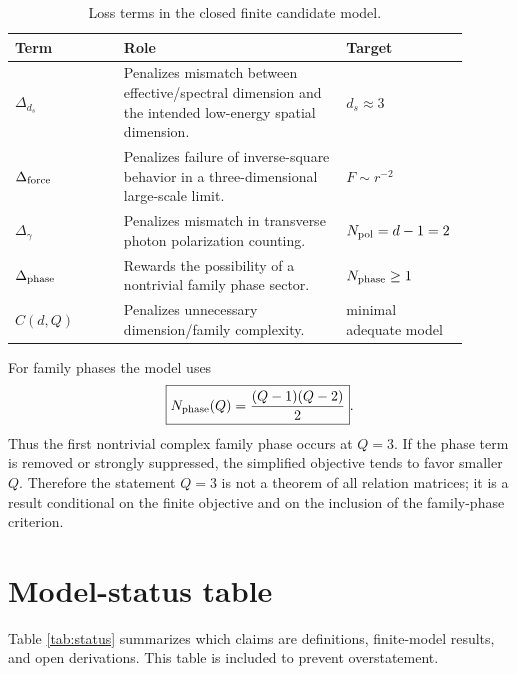 \documentclass[11pt,a4paper]{article}
\begin{document}
\begin{table}[ht]
\centering
\caption{Loss terms in the closed finite candidate model.}
\label{tab:loss_terms}
\begin{tabular}{p{0.23\linewidth}p{0.47\linewidth}p{0.20\linewidth}}
\toprule
\textbf{Term} & \textbf{Role} & \textbf{Target}\\
\midrule
$\Delta_{d_s}$ & Penalizes mismatch between effective/spectral dimension and the intended low-energy spatial dimension. & $d_s\approx 3$\\
$\Delta_{\rm force}$ & Penalizes failure of inverse-square behavior in a three-dimensional large-scale limit. & $F\sim r^{-2}$\\
$\Delta_{\gamma}$ & Penalizes mismatch in transverse photon polarization counting. & $N_{\rm pol}=d-1=2$\\
$\Delta_{\rm phase}$ & Rewards the possibility of a nontrivial family phase sector. & $N_{\rm phase}\geq1$\\
$C(d,Q)$ & Penalizes unnecessary dimension/family complexity. & minimal adequate model\\
\bottomrule
\end{tabular}
\end{table}

For family phases the model uses
\begin{equation}
\boxed{N_{\rm phase}(Q)=\frac{(Q-1)(Q-2)}{2}} .
\label{eq:phase_count}
\end{equation}
Thus the first nontrivial complex family phase occurs at $Q=3$. If the phase term is removed or strongly suppressed, the simplified objective tends to favor smaller $Q$. Therefore the statement $Q=3$ is not a theorem of all relation matrices; it is a result conditional on the finite objective and on the inclusion of the family-phase criterion.

\section{Model-status table}
Table \ref{tab:status} summarizes which claims are definitions, finite-model results, and open derivations. This table is included to prevent overstatement.
\end{document}
